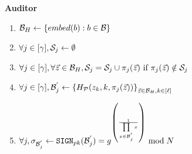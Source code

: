 \begin{mdframed}[frametitle={Delegated Fuzzy PSI}, frametitlealignment=\centering, 
	font=\small]
	
	\smallskip\noindent\textbf{Auditor}
	\begin{enumerate}
		\item[\auditorLabel{auditor:embed}] $\blocklistEmbedded \assign \setDefn{
			\embed(\genericBlocklistElmt): \genericBlocklistElmt \in \blocklist }$ 
		\item[\auditorNoLabel] $\forall \projIdx \in \nats[\numProjections], 
		\projBuckets[\projIdx] \assign \emptyset$
		\item[\auditorLabel{auditor:partition}] $\forall \projIdx \in \nats[\numProjections], \forall 
		\genericVec \in \blocklistEmbedded, 
		\projBuckets[\projIdx] =  \projBuckets[\projIdx] \cup \projFn[\projIdx](\genericVec) ~\mbox{if}~ 
		\projFn[\projIdx](\genericVec) \notin \projBuckets[\projIdx]$ 
		\item[\auditorLabel{auditor:augment}] $\forall \projIdx \in \nats[\numProjections],
		\projBucketsAugmented[\projIdx] \assign \setDefn{\primeRO(\genericVec[\vecIdx], \vecIdx, 
			\projFn[\projIdx](\genericVec))}_{\genericVec \in \blocklistEmbedded, \vecIdx \in 
			\nats[\genericVecLen]}$ 
		\item[\auditorLabel{auditor:sign}] $\forall \projIdx, 
		\genericSig[\projBucketsAugmented[\projIdx]] \assign 
		\signingAlg[\pubKey](\projBucketsAugmented[\projIdx]) = 
		\qrGen^{\left(\frac{1}{\prod\limits_{\genericSetElmt \in \projBucketsAugmented[\projIdx]} 
				\genericSetElmt}\right)} \bmod \rsaMod$
	\end{enumerate}
	

\end{mdframed}

